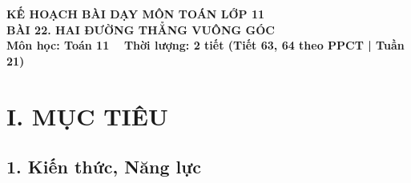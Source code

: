 \documentclass[12pt, a4paper]{article}
\begin{document}
\begin{center}
    {\fontsize{14pt}{17pt}\selectfont \textbf{KẾ HOẠCH BÀI DẠY MÔN TOÁN LỚP 11}}\\[6pt]
    {\fontsize{16pt}{19pt}\selectfont \textbf{BÀI 22. HAI ĐƯỜNG THẲNG VUÔNG GÓC}}\\[4pt]
    {\fontsize{12pt}{15pt}\selectfont \textbf{Môn học: Toán 11} \ \textbar \ \textbf{Thời lượng: 2 tiết (Tiết 63, 64 theo PPCT | Tuần 21)}}
\end{center}

\vspace{5pt}

\section*{I. MỤC TIÊU}

\subsection*{1. Kiến thức, Năng lực}
\end{document}

